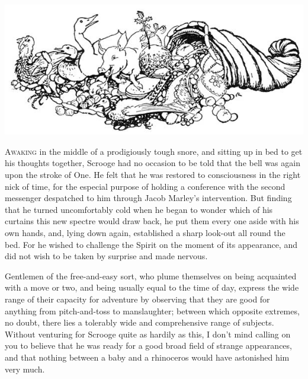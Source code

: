 \documentclass[paper=a5,BCOR=15mm,twoside,DIV=15,headinclude=off,12pt,chapterprefix=off,openany,headings=huge]{scrbook} %
\begin{document}
\begin{minipage}[c]{\linewidth}
\includegraphics[width=\linewidth]{gs094}
\end{minipage}

\lettrine[loversize=.85]{A}{waking} in the middle of a prodigiously tough snore, and sitting up in bed to get his thoughts together, Scrooge had no occasion to be told that the bell was again upon the stroke of One. He felt that he was restored to consciousness in the right nick of time, for the especial purpose of holding a conference with the second messenger despatched to him through Jacob Marley's intervention. But finding that he turned uncomfortably cold when he began to wonder which of his curtains this new spectre would draw back, he put them every one aside with his own hands, and, lying down again, established a sharp look-out all round the bed. For he wished to challenge the Spirit on the moment of its appearance, and did not wish to be taken by surprise and made nervous.

Gentlemen of the free-and-easy sort, who plume themselves on being acquainted with a move or two, and being usually equal to the time of day, express the wide range of their capacity for adventure by observing that they are good for anything from pitch-and-toss to manslaughter; between which opposite extremes, no doubt, there lies a tolerably wide and comprehensive range of subjects. Without venturing for Scrooge quite as hardily as this, I don't mind calling on you to believe that he was ready for a good broad field of strange appearances, and that nothing between a baby and a rhinoceros would have astonished him very much.
\end{document}

